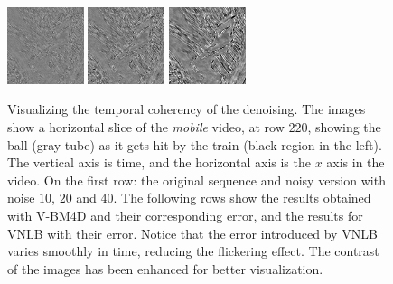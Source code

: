 \documentclass[10pt, journal, twocolumn, final, a4paper]{IEEEtran}
\begin{document}
\begin{figure}[thpb!]
\begin{center}
		               \hspace{0.2\textwidth}%
		\includegraphics[width=0.2\textwidth]{figs/temporal_slices/slice_mobile_mono_diff_vnlb_pt4_s10_row220_col040-180_fra080-220.png}%
		\includegraphics[width=0.2\textwidth]{figs/temporal_slices/slice_mobile_mono_diff_vnlb_pt4_s20_row220_col040-180_fra080-220.png}%
		\includegraphics[width=0.2\textwidth]{figs/temporal_slices/slice_mobile_mono_diff_vnlb_pt4_s40_row220_col040-180_fra080-220.png}\\
	\end{center}
	\caption{Visualizing the temporal coherency of the denoising. The images
		show a horizontal slice of the \emph{mobile} video, at row $220$, showing
		the ball (gray tube) as it gets hit by the train (black region in the
		left). The vertical axis is time, and the horizontal axis is the $x$ axis
		in the video. On the first row: the original sequence and noisy version with
		noise $10$, $20$ and $40$. The following rows show the results obtained
		with V-BM4D and their corresponding error, and the results for VNLB with their
		error. Notice that the error introduced by VNLB varies smoothly in time, reducing
		the flickering effect. The contrast of the images has been enhanced for
		better visualization.
} \label{fig:time-diff}
\end{figure}
\end{document}
